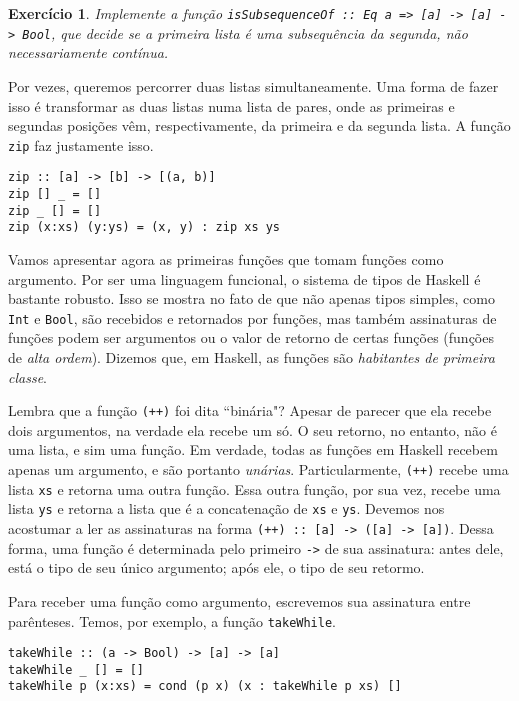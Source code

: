 \documentclass[a4paper]{article}
\newtheorem{exercicio}{Exercício}
\begin{document}
\begin{exercicio}
	Implemente a função \emph{\texttt{isSubsequenceOf :: Eq a => [a] -> [a] -> Bool}}, que decide se a primeira lista é uma subsequência da segunda, não necessariamente contínua.
\end{exercicio}

Por vezes, queremos percorrer duas listas simultaneamente.
Uma forma de fazer isso é transformar as duas listas numa lista de pares, onde as primeiras e segundas posições vêm, respectivamente, da primeira e da segunda lista.
A função \texttt{zip} faz justamente isso.

\begin{verbatim}
zip :: [a] -> [b] -> [(a, b)]
zip [] _ = []
zip _ [] = []
zip (x:xs) (y:ys) = (x, y) : zip xs ys
\end{verbatim}

Vamos apresentar agora as primeiras funções que tomam funções como argumento.
Por ser uma linguagem funcional, o sistema de tipos de Haskell é bastante robusto.
Isso se mostra no fato de que não apenas tipos simples, como \texttt{Int} e \texttt{Bool}, são recebidos e retornados por funções, mas também assinaturas de funções podem ser argumentos ou o valor de retorno de certas funções (funções de \emph{alta ordem}).
Dizemos que, em Haskell, as funções são \emph{habitantes de primeira classe}.

Lembra que a função \texttt{(++)} foi dita ``binária"?
Apesar de parecer que ela recebe dois argumentos, na verdade ela recebe um só.
O seu retorno, no entanto, não é uma lista, e sim uma função.
Em verdade, todas as funções em Haskell recebem apenas um argumento, e são portanto \emph{unárias}.
Particularmente, \texttt{(++)} recebe uma lista \texttt{xs} e retorna uma outra função.
Essa outra função, por sua vez, recebe uma lista \texttt{ys} e  retorna a lista que é a concatenação de \texttt{xs} e \texttt{ys}.
Devemos nos acostumar a ler as assinaturas na forma \texttt{(++) :: [a] -> ([a] -> [a])}.
Dessa forma, uma função é determinada pelo primeiro \texttt{->} de sua assinatura: antes dele, está o tipo de seu único argumento; após ele, o tipo de seu retormo.

Para receber uma função como argumento, escrevemos sua assinatura entre parênteses.
Temos, por exemplo, a função \texttt{takeWhile}.

\begin{verbatim}
takeWhile :: (a -> Bool) -> [a] -> [a]
takeWhile _ [] = []
takeWhile p (x:xs) = cond (p x) (x : takeWhile p xs) []
\end{verbatim}
\end{document}

